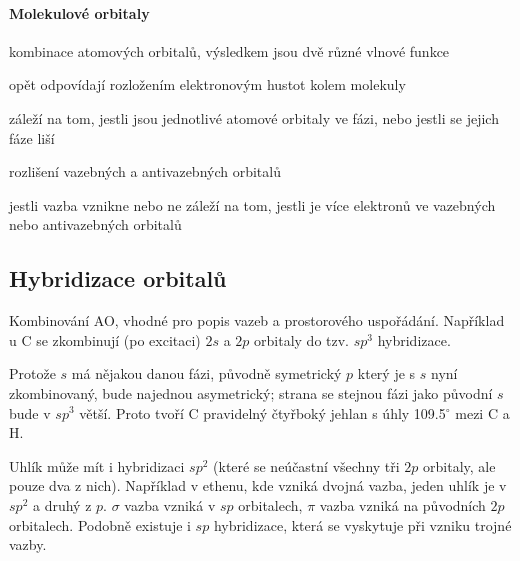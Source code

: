 \documentclass[DIV=8]{scrreprt}
\begin{document}
\paragraph{Molekulové orbitaly}
\begin{myItemize}[nosep]
    \item kombinace atomových orbitalů, výsledkem jsou dvě různé vlnové funkce
    \item opět odpovídají rozložením elektronovým hustot kolem molekuly
    \item záleží na tom, jestli jsou jednotlivé atomové orbitaly ve fázi, nebo jestli se jejich fáze liší
\begin{myItemize}[nosep]
    \item rozlišení vazebných a antivazebných orbitalů
    \item jestli vazba vznikne nebo ne záleží na tom, jestli je více elektronů ve vazebných nebo antivazebných orbitalů
\end{myItemize}

\end{myItemize}



\subsection{Hybridizace orbitalů} \label{Hybridizace orbitalů}


Kombinování AO, vhodné pro popis vazeb a prostorového uspořádání. Například u C se zkombinují (po excitaci) \(2s\) a \(2p\) orbitaly do tzv. \(sp^3\) hybridizace.

Protože \(s\) má nějakou danou fázi, původně symetrický \(p\) který je s \(s\) nyní zkombinovaný, bude najednou asymetrický; strana se stejnou fázi jako původní \(s\) bude v \(sp^3\) větší.
Proto tvoří C pravidelný čtyřboký jehlan s úhly 109.5\(^{\circ}\) mezi C a H.

Uhlík může mít i hybridizaci \(sp^2\) (které se neúčastní všechny tři \(2p\) orbitaly, ale pouze dva z nich). Například v ethenu, kde vzniká dvojná vazba, jeden uhlík je v \(sp^2\) a druhý z \(p\). \(\sigma\) vazba vzniká v \(sp\) orbitalech, \(\pi\) vazba vzniká na původních \(2p\) orbitalech. Podobně existuje i \(sp\) hybridizace, která se vyskytuje při vzniku trojné vazby.
\end{document}
